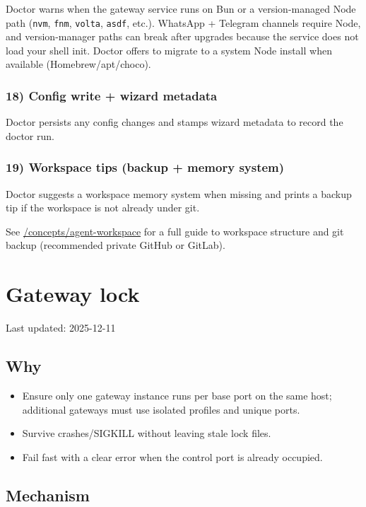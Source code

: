 Doctor warns when the gateway service runs on Bun or a version-managed Node path
(\texttt{nvm}, \texttt{fnm}, \texttt{volta}, \texttt{asdf}, etc.). WhatsApp + Telegram channels require Node,
and version-manager paths can break after upgrades because the service does not
load your shell init. Doctor offers to migrate to a system Node install when
available (Homebrew/apt/choco).

\subsubsection{18) Config write + wizard metadata}


Doctor persists any config changes and stamps wizard metadata to record the
doctor run.

\subsubsection{19) Workspace tips (backup + memory system)}


Doctor suggests a workspace memory system when missing and prints a backup tip
if the workspace is not already under git.

See \href{/concepts/agent-workspace}{/concepts/agent-workspace} for a full guide to
workspace structure and git backup (recommended private GitHub or GitLab).


\clearpage

\section{Gateway lock}


Last updated: 2025-12-11

\subsection{Why}


\begin{itemize}
  \item Ensure only one gateway instance runs per base port on the same host; additional gateways must use isolated profiles and unique ports.
  \item Survive crashes/SIGKILL without leaving stale lock files.
  \item Fail fast with a clear error when the control port is already occupied.
\end{itemize}


\subsection{Mechanism}


